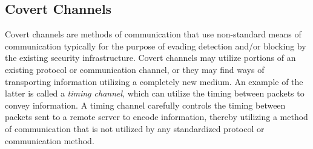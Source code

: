 \documentclass{llncs}
\begin{document}
%

\subsection{Covert Channels}

Covert channels are methods of communication that use non-standard means of
communication typically for the purpose of evading detection and/or blocking by the
existing security infrastructure. Covert channels may utilize portions of an
existing protocol\cite{Born2010.psudp} or communication channel, or they may
find ways of transporting information utilizing a completely new medium. An
example of the latter is called a \emph{timing channel}\cite{Sellke2009}, which
can utilize the timing between packets to convey information. A timing channel
carefully controls the timing between packets sent to a remote server to encode
information, thereby utilizing a method of communication that is not utilized by
any standardized protocol or communication method.
\end{document}
